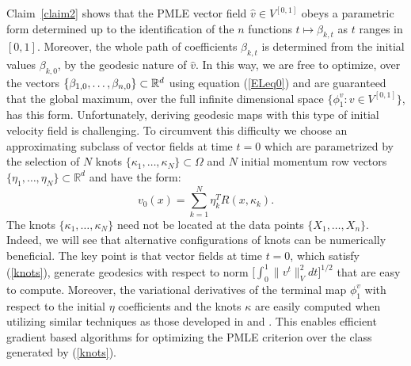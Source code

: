 \documentclass[noinfoline]{imsart}
\begin{document}
Claim~\ref{claim2} shows that the PMLE vector field $\hat{v}\in V^{[0,1]}$ obeys a parametric form determined up to the identification of the $n$ functions $t\mapsto \beta_{k,t}$ as $t$ ranges in $[0,1]$. Moreover, the whole path of coefficients $\beta_{k,t}$ is determined from the initial values $\beta_{k,0}$, by the geodesic nature of $\hat v$.
In this way, we are free to optimize, over the vectors $\{\beta_{1,0}, \ldots, \beta_{n,0}\}\subset \Bbb R^d$ using equation (\ref{ELeq0})
 and are guaranteed that the global maximum, over the full infinite dimensional space $\{ \phi_1^v\colon v\in V^{[0,1]}\}$, has this form.  Unfortunately, deriving geodesic maps with this type of initial velocity field is challenging.
To circumvent this difficulty we choose an approximating  subclass of vector fields at time $t=0$ which are parametrized by the selection of $N$ knots $\{\kappa_{1},\ldots, \kappa_N\} \subset \Omega$ and $N$ initial momentum row vectors $\{\eta_{1},\ldots, \eta_N\} \subset  \mathbb{R}^d$ and have the form:
\begin{equation}
\label{knots}
 v_0(x)= \sum_{k=1}^N \eta^T_{k} R(x,\kappa_{k}).
 \end{equation}
The knots $\{ \kappa_1,\ldots, \kappa_N\}$ need not be located at the data points $\{X_1,\ldots, X_n \}$. Indeed, we will see that alternative configurations of knots can be numerically beneficial. The key point is that vector fields at time $t=0$, which satisfy (\ref{knots}), generate geodesics with respect to norm $\bigl[\int_0^1 \| v^t  \|^2_V dt \bigr]^{1/2}$ that are easy to compute. Moreover, the variational derivatives of the terminal map $\phi^v_1$ with respect to the initial $\eta$ coefficients and the knots $\kappa$ are easily computed when utilizing  similar techniques  as those developed in \cite{vaillant:04} and \cite{alla:07}. This enables efficient gradient based algorithms for optimizing the PMLE criterion over the class generated by (\ref{knots}).
\end{document}
